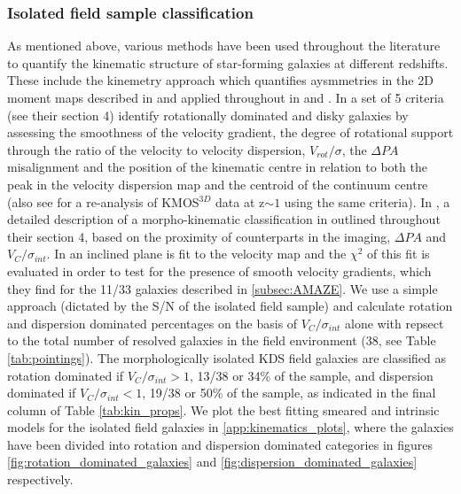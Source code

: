 \documentclass[fleqn,usenatbib]{mn2e}
\begin{document}
\subsubsection{Isolated field sample classification}\label{subsubsection:isolated_classification}
As mentioned above, various methods have been used throughout the literature to quantify the kinematic structure of star-forming galaxies at different redshifts. 
These include the kinemetry approach which quantifies aysmmetries in the 2D moment maps described in \cite{Shapiro2008} and applied throughout in \cite{ForsterSchreiber2009} and \cite{Cresci2009}.
In \cite{Wisnioski2015} a set of 5 criteria (see their section 4) identify rotationally dominated and disky galaxies by assessing the smoothness of the velocity gradient, the degree of rotational support through the ratio of the velocity to velocity dispersion, $V_{rot}/\sigma$, the $\Delta PA$ misalignment and the position of the kinematic centre in relation to both the peak in the velocity dispersion map and the centroid of the continuum centre (also see \cite{Rodrigues2016} for a re-analysis of KMOS$^{3D}$ data at z$\sim 1$ using the same criteria).   
In \cite{Epinat2012}, a detailed description of a morpho-kinematic classification in outlined throughout their section 4, based on the proximity of counterparts in the imaging, $\Delta PA$ and $V_{C}/\sigma_{int}$.
In \cite{Gnerucci2011} an inclined plane is fit to the velocity map and the $\chi^{2}$ of this fit is evaluated in order to test for the presence of smooth velocity gradients, which they find for the 11/33 galaxies described in \cref{subsec:AMAZE}.
We use a simple approach (dictated by the S/N of the isolated field sample) and calculate rotation and dispersion dominated percentages on the basis of $V_{C}/\sigma_{int}$ alone with repsect to the total number of resolved galaxies in the field environment (38, see Table \ref{tab:pointings}).
The morphologically isolated KDS field galaxies are classified as rotation dominated if $V_{C}/\sigma_{int} > 1$, 13/38 or 34\% of the sample, and dispersion dominated if $V_{C}/\sigma_{int} < 1$, 19/38 or 50\% of the sample, as indicated in the final column of Table \ref{tab:kin_props}.
We plot the best fitting smeared and intrinsic models for the isolated field galaxies in \cref{app:kinematics_plots}, where the galaxies have been divided into rotation and dispersion dominated categories in figures \ref{fig:rotation_dominated_galaxies} and \ref{fig:dispersion_dominated_galaxies} respectively.
\end{document}
